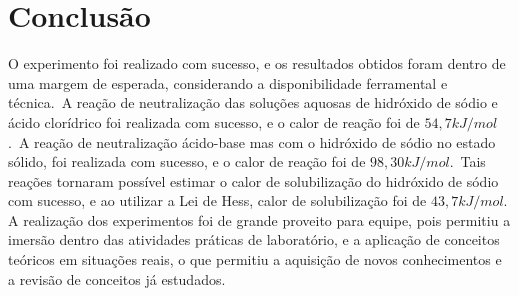\section{Conclusão}\label{sec:conclusao}
        \indent O experimento foi realizado com sucesso, e os resultados obtidos foram dentro de uma margem de esperada, considerando a disponibilidade ferramental e técnica.\ A reação de neutralização das soluções aquosas de hidróxido de sódio e ácido clorídrico foi realizada com sucesso, e o calor de reação foi de $54,7 kJ/mol$.\ A reação de neutralização ácido-base mas com o hidróxido de sódio no estado sólido, foi realizada com sucesso, e o calor de reação foi de $98,30 kJ/mol$.\ Tais reações tornaram possível estimar o calor de solubilização do hidróxido de sódio com sucesso, e ao utilizar a Lei de Hess, calor de solubilização foi de $43,7 kJ/mol$.\\

        \indent A realização dos experimentos foi de grande proveito para equipe, pois permitiu a imersão dentro das atividades práticas de laboratório, e a aplicação de conceitos teóricos em situações reais, o que permitiu a aquisição de novos conhecimentos e a revisão de conceitos já estudados.\\